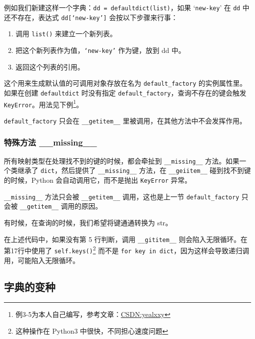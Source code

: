 例如我们新建这样一个字典：\texttt{dd = defaultdict(list)}，如果 `\texttt{new-key}' 在 \texttt{dd} 中还不存在，表达式 \texttt{dd[`new-key']} 会按以下步骤来行事：

\begin{enumerate}
    \item 调用 \texttt{list()} 来建立一个新列表。
    \item 把这个新列表作为值，\texttt{`new-key'} 作为键，放到 dd 中。
    \item 返回这个列表的引用。 
\end{enumerate}

这个用来生成默认值的可调用对象存放在名为 \texttt{default\_factory} 的实例属性里。如果在创建 \texttt{defaultdict} 时没有指定 \texttt{default\_factory}，查询不存在的键会触发 \texttt{KeyError}。用法见下例\footnote{例3-5为本人自己编写，参考文章：\href{https://blog.csdn.net/u014248127/article/details/79338543}{CSDN:yealxxy}}。



\texttt{default\_factory} 只会在 \texttt{\_\_getitem\_\_} 里被调用，在其他方法中不会发挥作用。

\subsubsection{特殊方法 \_\_missing\_\_}

所有映射类型在处理找不到的键的时候，都会牵扯到 \texttt{\_\_missing\_\_} 方法。如果一个类继承了 \texttt{dict}，然后提供了 \texttt{\_\_missing\_\_} 方法，在 \texttt{\_\_geiitem\_\_} 碰到找不到键的时候，Python 会自动调用它，而不是抛出 \texttt{KeyError} 异常。

\texttt{\_\_missing\_\_} 方法只会被 \texttt{\_\_getitem\_\_} 调用，这也是上一节 \texttt{default\_factory} 只会被 \texttt{\_\_getitem\_\_} 调用的原因。

有时候，在查询的时候，我们希望将键通通转换为 str。



在上述代码中，如果没有第 5 行判断，调用 \texttt{\_\_gititem\_\_} 则会陷入无限循环。在第17行中使用了 \texttt{self.keys()}\footnote{这种操作在 Python3 中很快，不同担心速度问题} 而不是 \texttt{for key in dict}，因为这样会导致递归调用，可能陷入无限循环。

\subsection{字典的变种}

